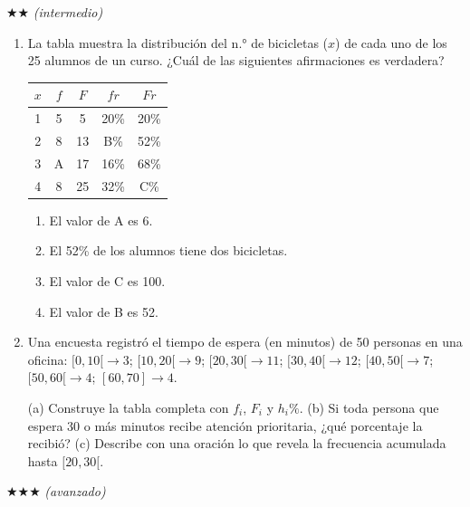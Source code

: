 \documentclass[11pt, letterpaper]{article}
\begin{document}
$\bigstar\bigstar$ \textit{(intermedio)}

\begin{enumerate}[label=\textbf{\arabic*.}, leftmargin=*, resume]
  \item La tabla muestra la distribución del n.° de bicicletas ($x$) de cada uno de los 25 alumnos de un curso. ¿Cuál de las siguientes afirmaciones es verdadera?
  \begin{center}
  \renewcommand{\arraystretch}{1.3}
  \begin{tabular}{c c c c c}
  \toprule
  $x$ & $f$ & $F$ & $fr$ & $Fr$\\
  \midrule
  1 & 5 & 5 & 20\% & 20\%\\
  2 & 8 & 13 & B\% & 52\%\\
  3 & A & 17 & 16\% & 68\%\\
  4 & 8 & 25 & 32\% & C\%\\
  \bottomrule
  \end{tabular}
  \end{center}
  \begin{enumerate}[label=\Alph*),leftmargin=14pt]
    \item El valor de A es 6.
    \item El 52\% de los alumnos tiene dos bicicletas.
    \item El valor de C es 100.
    \item El valor de B es 52.
  \end{enumerate}

  \item Una encuesta registró el tiempo de espera (en minutos) de 50 personas en una oficina:
  $[0,10[ \to 3$;\; $[10,20[ \to 9$;\; $[20,30[ \to 11$;\; $[30,40[ \to 12$;\; $[40,50[ \to 7$;\; $[50,60[ \to 4$;\; $[60,70] \to 4$.

  (a) Construye la tabla completa con $f_i$, $F_i$ y $h_i\%$.
  (b) Si toda persona que espera 30 o más minutos recibe atención prioritaria, ¿qué porcentaje la recibió?
  (c) Describe con una oración lo que revela la frecuencia acumulada hasta $[20,30[$.
\end{enumerate}

$\bigstar\bigstar\bigstar$ \textit{(avanzado)}
\end{document}
